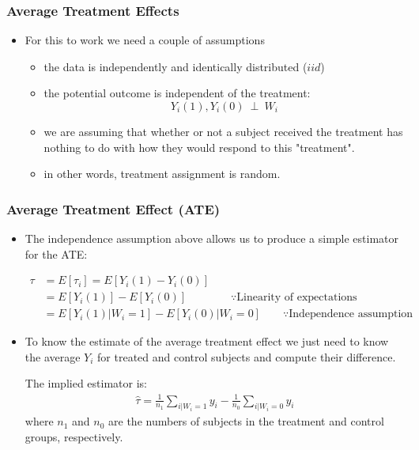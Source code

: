 \documentclass[
  shownotes,
  xcolor={svgnames},
  hyperref={colorlinks,citecolor=DarkBlue,linkcolor=DarkRed,urlcolor=DarkBlue}
  , aspectratio=169]{beamer}
\begin{document}
\begin{frame}[fragile]
\frametitle{Average Treatment Effects}
  

  \begin{itemize}
  \item For this to work we need a couple of assumptions
  \medskip
  \begin{itemize}
    \item  the data is independently and identically distributed ($iid$)
    \medskip
    \item the potential outcome is independent of the treatment:
    \bigskip
    $$Y_i(1), Y_i(0) \ \perp \ W_i $$
  \bigskip
  
  \item we are assuming that whether or not a subject received the treatment has nothing to do with how they would respond to this "treatment". 
  \medskip
  \item in other words, treatment assignment is random.  
  
\end{itemize}
\end{itemize}

\end{frame}
\begin{frame}[fragile]
\frametitle{Average Treatment Effect (ATE)}

\begin{itemize}
\item The independence assumption above allows us to produce a simple estimator for the ATE:

\begin{align}
\tau &= E[\tau_{i}] = E[Y_i(1) - Y_i(0)] \\
    &= E[Y_i(1)] - E[Y_i(0)]  \qquad \qquad \because \text{Linearity of expectations}\\
    &= E[Y_i(1)|W_i = 1] - E[Y_i(0)|W_i = 0] \qquad \because \text{Independence assumption} 
\end{align}


\item To know the estimate of the average treatment effect we just need to know the average $Y_i$ for treated and control subjects and compute their difference. 

The implied estimator is:
\begin{align}
\hat{\tau} = \frac{1}{n_1}\sum_{i | W_i = 1} y_i  - \frac{1}{n_0}\sum_{i | W_i = 0} y_{i}
\end{align}
where $n_1$ and $n_0$ are the numbers of subjects in the treatment and control groups, respectively. 

\end{itemize}



\end{frame}
\end{document}
